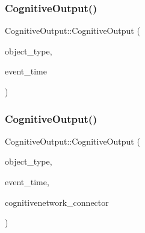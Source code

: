 \mbox{\label{classCognitiveOutput_a4751f511d329c66ed80a3c127e5e9e6d}} 
\subsubsection{\texorpdfstring{Cognitive\+Output()}{CognitiveOutput()}\hspace{0.1cm}{\footnotesize\ttfamily [3/4]}}
{\footnotesize\ttfamily Cognitive\+Output\+::\+Cognitive\+Output (\begin{DoxyParamCaption}\item[{unsigned int}]{object\+\_\+type,  }\item[{std\+::chrono\+::time\+\_\+point$<$ \mbox{\hyperlink{universe_8h_a0ef8d951d1ca5ab3cfaf7ab4c7a6fd80}{Clock}} $>$}]{event\+\_\+time }\end{DoxyParamCaption})\hspace{0.3cm}{\ttfamily [inline]}}

\mbox{\label{classCognitiveOutput_a9874901c7b49a6bb495d34c84fdbf651}} 
\subsubsection{\texorpdfstring{Cognitive\+Output()}{CognitiveOutput()}\hspace{0.1cm}{\footnotesize\ttfamily [4/4]}}
{\footnotesize\ttfamily Cognitive\+Output\+::\+Cognitive\+Output (\begin{DoxyParamCaption}\item[{unsigned int}]{object\+\_\+type,  }\item[{std\+::chrono\+::time\+\_\+point$<$ \mbox{\hyperlink{universe_8h_a0ef8d951d1ca5ab3cfaf7ab4c7a6fd80}{Clock}} $>$}]{event\+\_\+time,  }\item[{\mbox{\hyperlink{classCognitiveNetwork}{Cognitive\+Network}} \&}]{cognitivenetwork\+\_\+connector }\end{DoxyParamCaption})\hspace{0.3cm}{\ttfamily [inline]}}

\mbox{\label{classCognitiveOutput_aefe310a8577684210d82236033791036}} 
